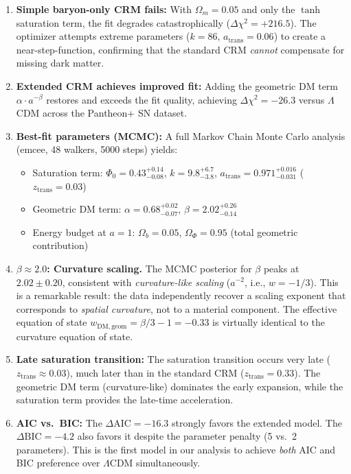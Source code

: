 \documentclass[aps,prd,twocolumn,superscriptaddress,nofootinbib]{revtex4-2}
\begin{document}
\begin{enumerate}
\item \textbf{Simple baryon-only CRM fails:} With $\Omega_m = 0.05$ and only the $\tanh$ saturation term, the fit degrades catastrophically ($\Delta\chi^2 = +216.5$). The optimizer attempts extreme parameters ($k = 86$, $a_{\mathrm{trans}} = 0.06$) to create a near-step-function, confirming that the standard CRM \textit{cannot} compensate for missing dark matter.

\item \textbf{Extended CRM achieves improved fit:} Adding the geometric DM term $\alpha \cdot a^{-\beta}$ restores and exceeds the fit quality, achieving $\Delta\chi^2 = -26.3$ versus $\Lambda$CDM across the Pantheon+ SN dataset.

\item \textbf{Best-fit parameters (MCMC):} A full Markov Chain Monte Carlo analysis (emcee, 48 walkers, 5000 steps) yields:
\begin{itemize}
\item Saturation term: $\Phi_0 = 0.43^{+0.14}_{-0.08}$, $k = 9.8^{+6.7}_{-3.8}$, $a_{\mathrm{trans}} = 0.971^{+0.016}_{-0.031}$ ($z_{\mathrm{trans}} = 0.03$)
\item Geometric DM term: $\alpha = 0.68^{+0.02}_{-0.07}$, $\beta = 2.02^{+0.26}_{-0.14}$
\item Energy budget at $a = 1$: $\Omega_b = 0.05$, $\Omega_\Phi = 0.95$ (total geometric contribution)
\end{itemize}

\item \textbf{$\beta \approx 2.0$: Curvature scaling.} The MCMC posterior for $\beta$ peaks at $2.02 \pm 0.20$, consistent with \textit{curvature-like scaling} ($a^{-2}$, i.e., $w = -1/3$). This is a remarkable result: the data independently recover a scaling exponent that corresponds to \textit{spatial curvature}, not to a material component. The effective equation of state $w_{\mathrm{DM,geom}} = \beta/3 - 1 = -0.33$ is virtually identical to the curvature equation of state.

\item \textbf{Late saturation transition:} The saturation transition occurs very late ($z_{\mathrm{trans}} \approx 0.03$), much later than in the standard CRM ($z_{\mathrm{trans}} = 0.33$). The geometric DM term (curvature-like) dominates the early expansion, while the saturation term provides the late-time acceleration.

\item \textbf{AIC vs.\ BIC:} The $\Delta\mathrm{AIC} = -16.3$ strongly favors the extended model. The $\Delta\mathrm{BIC} = -4.2$ also favors it despite the parameter penalty (5 vs.\ 2 parameters). This is the first model in our analysis to achieve \textit{both} AIC and BIC preference over $\Lambda$CDM simultaneously.
\end{enumerate}
\end{document}
